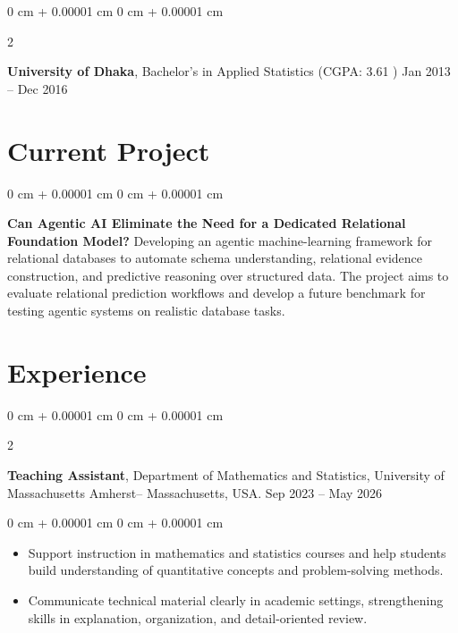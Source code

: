 \documentclass[10pt, letterpaper]{article}
\newenvironment{highlights}{
    \begin{itemize}[
        topsep=0.10 cm,
        parsep=0.10 cm,
        partopsep=0pt,
        itemsep=0pt,
        leftmargin=0 cm + 10pt
    ]
}{
    \end{itemize}
} %
\newenvironment{onecolentry}{
    \begin{adjustwidth}{
        0 cm + 0.00001 cm
    }{
        0 cm + 0.00001 cm
    }
}{
    \end{adjustwidth}
} %
\newenvironment{twocolentry}[2][]{
    \onecolentry
    \def\secondColumn{#2}
    \setcolumnwidth{\fill, 4.5 cm}
    \begin{paracol}{2}
}{
    \switchcolumn \raggedleft \secondColumn
    \end{paracol}
    \endonecolentry
} %
\begin{document}
    \begin{twocolentry}{
            Jan 2013 – Dec 2016
        }
            \textbf{University of Dhaka}, Bachelor's in Applied Statistics (CGPA: 3.61 )\end{twocolentry}
    
    \section{Current Project}

        \begin{onecolentry}
            \textbf{Can Agentic AI Eliminate the Need for a Dedicated Relational Foundation Model?} Developing an agentic machine-learning framework for relational databases to automate schema understanding, relational evidence construction, and predictive reasoning over structured data. The project aims to evaluate relational prediction workflows and develop a future benchmark for testing agentic systems on realistic database tasks.
        \end{onecolentry}

    \section{Experience}
    
    \begin{twocolentry}{
            Sep 2023 – May 2026
        }
            \textbf{Teaching Assistant}, Department of Mathematics and Statistics, University of Massachusetts Amherst-- Massachusetts, USA.\end{twocolentry}
    \begin{onecolentry}
        \begin{highlights}
            \item Support instruction in mathematics and statistics courses and help students build understanding of quantitative concepts and problem-solving methods.
            \item Communicate technical material clearly in academic settings, strengthening skills in explanation, organization, and detail-oriented review.
        \end{highlights}
    \end{onecolentry}
\end{document}
